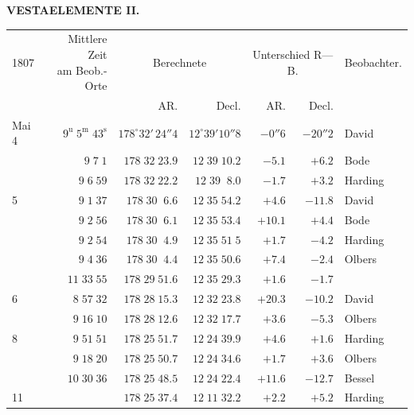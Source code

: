 \par\clearpage
\thispagestyle{empty}
\noindent{}%
%
\parbox[t]{\dimexpr\linewidth-24mm\relax}{\centering\footnotesize\bfseries VESTA\quad ELEMENTE II.\par}%
\makebox[12mm][r]{}\par\nobreak\medskip
\begingroup
\fontsize{9}{11}\selectfont
\setlength{\tabcolsep}{2.5pt}\renewcommand{\arraystretch}{1.10}
\begin{longtable}{l|r|r|r|r|r|l}
1807 & \shortstack{Mittlere Zeit\\am Beob.-Orte} & \multicolumn{2}{c|}{Berechnete} & \multicolumn{2}{c|}{Unterschied R—B.} & Beobachter. \\
& & AR. & Decl. & AR. & Decl. & \\ \hline
Mai 4 & $9^{\text{u}}\;5^{\text{m}}\;43^{\text{s}}$ & $178^\circ 32'\,24''4$ & $12^\circ 39' 10''8$ & $-0''6$ & $-20''2$ & David \\
 & $9\;7\;1$ & $178\;32\;23.9$ & $12\;39\;10.2$ & $-5.1$ & $+6.2$ & Bode \\
 & $9\;6\;59$ & $178\;32\;22.2$ & $12\;39\;\;8.0$ & $-1.7$ & $+3.2$ & Harding \\
5 & $9\;1\;37$ & $178\;30\;\;6.6$ & $12\;35\;54.2$ & $+4.6$ & $-11.8$ & David \\
 & $9\;2\;56$ & $178\;30\;\;6.1$ & $12\;35\;53.4$ & $+10.1$ & $+4.4$ & Bode \\
 & $9\;2\;54$ & $178\;30\;\;4.9$ & $12\;35\;51\;5$ & $+1.7$ & $-4.2$ & Harding \\
 & $9\;4\;36$ & $178\;30\;\;4.4$ & $12\;35\;50.6$ & $+7.4$ & $-2.4$ & Olbers \\
 & $11\;33\;55$ & $178\;29\;51.6$ & $12\;35\;29.3$ & $+1.6$ & $-1.7$ &  \\
6 & $8\;57\;32$ & $178\;28\;15.3$ & $12\;32\;23.8$ & $+20.3$ & $-10.2$ & David \\
 & $9\;16\;10$ & $178\;28\;12.6$ & $12\;32\;17.7$ & $+3.6$ & $-5.3$ & Olbers \\
8 & $9\;51\;51$ & $178\;25\;51.7$ & $12\;24\;39.9$ & $+4.6$ & $+1.6$ & Harding \\
 & $9\;18\;20$ & $178\;25\;50.7$ & $12\;24\;34.6$ & $+1.7$ & $+3.6$ & Olbers \\
 & $10\;30\;36$ & $178\;25\;48.5$ & $12\;24\;22.4$ & $+11.6$ & $-12.7$ & Bessel \\
11 &  & $178\;25\;37.4$ & $12\;11\;32.2$ & $+2.2$ & $+5.2$ & Harding \\

\end{longtable}
